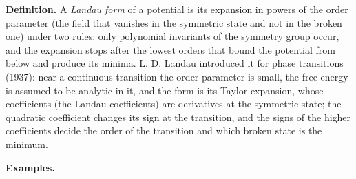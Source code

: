 \documentclass[
  10pt,
]{article}
\begin{document}
\textbf{Definition.} A \emph{Landau form} of a potential is its
expansion in powers of the order parameter (the field that vanishes in
the symmetric state and not in the broken one) under two rules: only
polynomial invariants of the symmetry group occur, and the expansion
stops after the lowest orders that bound the potential from below and
produce its minima. L. D. Landau introduced it for phase transitions
(1937): near a continuous transition the order parameter is small, the
free energy is assumed to be analytic in it, and the form is its Taylor
expansion, whose coefficients (the Landau coefficients) are derivatives
at the symmetric state; the quadratic coefficient changes its sign at
the transition, and the signs of the higher coefficients decide the
order of the transition and which broken state is the minimum.

\textbf{Examples.}
\end{document}
